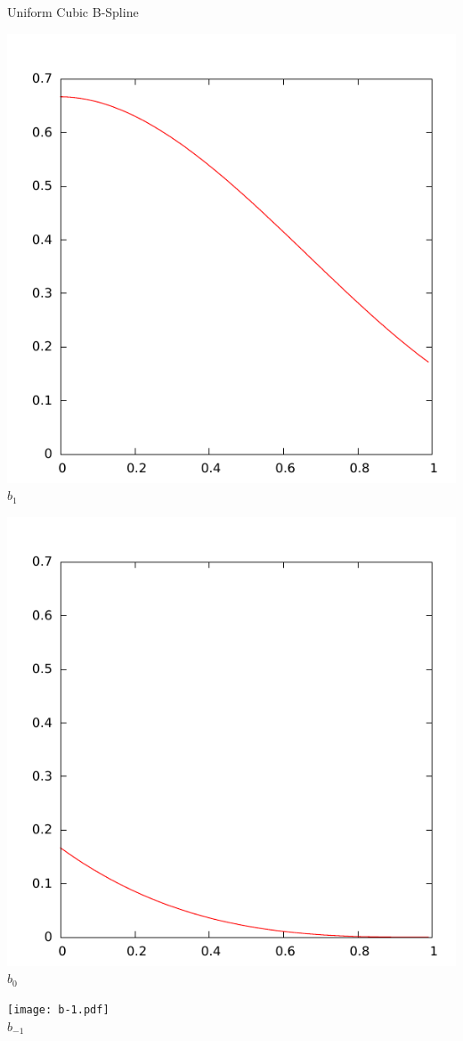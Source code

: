 \documentclass{beamer}
\begin{document}
\begin{frame}{Uniform Cubic B-Spline}
\begin{minipage}{0.25\columnwidth}
    \includegraphics[width=\columnwidth]{b1.pdf}\\
    $b_1$
  \end{minipage}%
  \begin{minipage}{0.25\columnwidth}
    \centering
    \includegraphics[width=\columnwidth]{b0.pdf}\\
    $b_0$
  \end{minipage}%
  \begin{minipage}{0.25\columnwidth}
    \centering
    \texttt{[image: b-1.pdf]}\\
    $b_{-1}$
  \end{minipage}
  
\end{frame}
\end{document}
